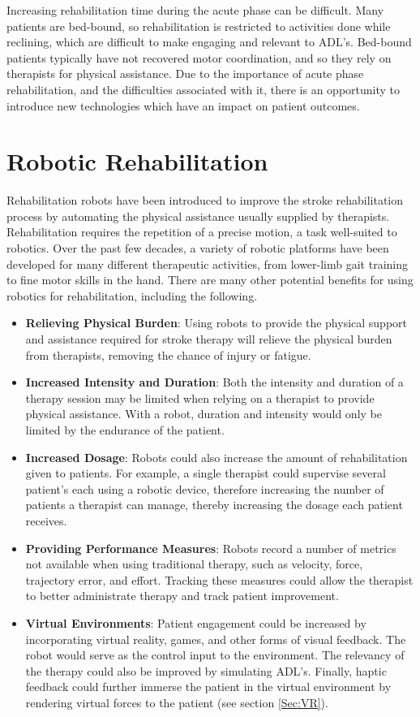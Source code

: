\documentclass[12pt]{report}
\begin{document}
Increasing rehabilitation time during the acute phase can be difficult. Many patients are bed-bound, so rehabilitation is restricted to activities done while reclining, which are difficult to make engaging and relevant to ADL's. Bed-bound patients typically have not recovered motor coordination, and so they rely on therapists for physical assistance. Due to the importance of acute phase rehabilitation, and the difficulties associated with it, there is an opportunity to introduce new technologies which have an impact on patient outcomes. 



\section{Robotic Rehabilitation}

	Rehabilitation robots have been introduced to improve the stroke rehabilitation process by automating the physical assistance usually supplied by therapists. Rehabilitation requires the repetition of a precise motion, a task well-suited to robotics. Over the past few decades, a variety of robotic platforms have been developed for many different therapeutic activities, from lower-limb gait training to fine motor skills in the hand. There are many other potential benefits for using robotics for rehabilitation, including the following.
\begin{itemize}
	\item \textbf{Relieving Physical Burden}: Using robots to provide the physical support and assistance required for stroke therapy will relieve the physical burden from therapists, removing the chance of injury or fatigue.
	\item \textbf{Increased Intensity and Duration}: Both the intensity and duration of a therapy session may be limited when relying on a therapist to provide physical assistance. With a robot, duration and intensity would only be limited by the endurance of the patient. 
	\item \textbf{Increased Dosage}: Robots could also increase the amount of rehabilitation given to patients. For example, a single therapist could supervise several patient's each using a robotic device, therefore increasing the number of patients a therapist can manage, thereby increasing the dosage each patient receives.
	\item \textbf{Providing Performance Measures}: Robots record a number of metrics not available when using traditional therapy, such as velocity, force, trajectory error, and effort. Tracking these measures could allow the therapist to better administrate therapy and track patient improvement. 
	\item \textbf{Virtual Environments}: Patient engagement could be increased by incorporating virtual reality, games, and other forms of visual feedback. The robot would serve as the control input to the environment. The relevancy of the therapy could also be improved by simulating ADL's. Finally, haptic feedback could further immerse the patient in the virtual environment by rendering virtual forces to the patient (see section \ref{Sec:VR}).
\end{itemize}
	
\end{document}
